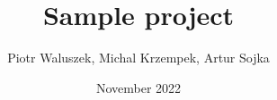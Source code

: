 \documentclass{article}
\title{Sample project}
\author{Piotr Waluszek, Michal Krzempek, Artur Sojka}
\date{November 2022}
\begin{document}
\maketitle


\pagebreak

\pagebreak

\end{document}
